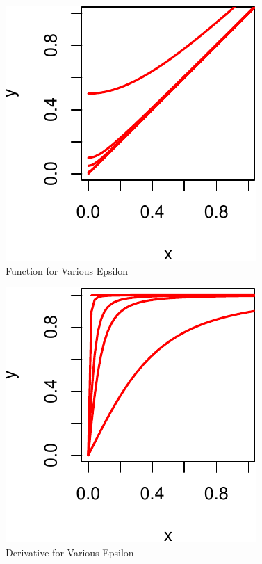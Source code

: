 \documentclass[
  12pt,
  letterpaper,
  DIV=11,
  numbers=noendperiod]{scrreprt}
\theoremstyle{remark}
\begin{document}
\begin{figure}[H]

{\centering \includegraphics{minimization_files/figure-pdf/dfsmoother-1.pdf}

}

\caption{Function for Various Epsilon}

\end{figure}%

\begin{figure}[H]

{\centering \includegraphics{minimization_files/figure-pdf/ddsmoother-1.pdf}

}

\caption{Derivative for Various Epsilon}

\end{figure}%
\end{document}

